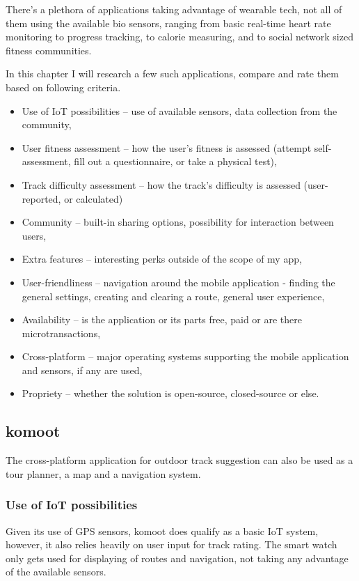 There's a plethora of applications taking advantage of wearable tech, not all of them using the available bio sensors, ranging from basic real-time heart rate monitoring to progress tracking, to calorie measuring, and to social network sized fitness communities.

In this chapter I will research a few such applications, compare and rate them based on following criteria. 
\begin{itemize}
    \item Use of IoT possibilities -- use of available sensors, data collection from the community,
    \item User fitness assessment -- how the user's fitness is assessed (attempt self-assessment, fill out a questionnaire, or take a physical test),
    \item Track difficulty assessment -- how the track's difficulty is assessed (user-reported, or calculated)
    \item Community -- built-in sharing options, possibility for interaction between users,
    \item Extra features -- interesting perks outside of the scope of my app,
    \item User-friendliness -- navigation around the mobile application - finding the general settings, creating and clearing a route, general user experience,
    \item Availability -- is the application or its parts free, paid or are there microtransactions,
    \item Cross-platform -- major operating systems supporting the mobile application and sensors, if any are used,
    \item Propriety -- whether the solution is open-source, closed-source or else.
\end{itemize}


\subsection{komoot}
The cross-platform application for outdoor track suggestion can also be used as a tour planner, a map and a navigation system.


\subsubsection*{Use of IoT possibilities}
Given its use of GPS sensors, komoot does qualify as a basic IoT system, however, it also relies heavily on user input for track rating.
The smart watch only gets used for displaying of routes and navigation, not taking any advantage of the available sensors.
